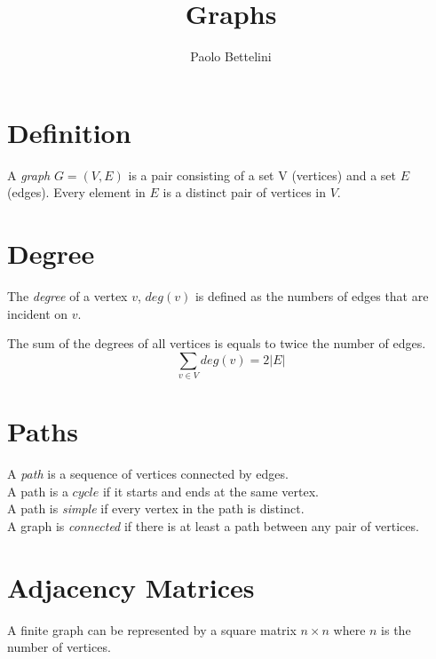 \documentclass{article}
\title{Graphs}
\author{Paolo Bettelini}
\date{}
\begin{document}
\maketitle
\tableofcontents
\pagebreak

\section{Definition}

A \textit{graph} \(G=(V,E)\) is a pair consisting of a set V (vertices)
and a set \(E\) (edges). Every element in \(E\) is a distinct pair of vertices
in \(V\).

\section{Degree}

The \textit{degree} of a vertex \(v\), \(deg(v)\) is defined
as the numbers of edges that are incident on \(v\).

The sum of the degrees of all vertices is equals to twice the number of edges.
\[
    \sum_{v\in V}deg(v)=2|E|
\]

\section{Paths}

A \textit{path} is a sequence of vertices connected by edges.
\\A path is a \(cycle\) if it starts and ends at the same vertex.
\\A path is \textit{simple} if every vertex in the path is distinct.
\\A graph is \textit{connected} if there is at least a path
between any pair of vertices.

\section{Adjacency Matrices}

A finite graph can be represented by a square matrix
\(n \times n\) where \(n\) is the number of vertices.
\end{document}
